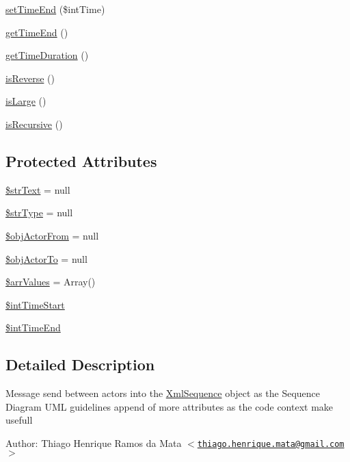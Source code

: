 \begin{CompactItemize}
\hyperlink{class_xml_sequence_message_c7e86ac9821f16f99b51d69c03f522bc}{setTimeEnd} (\$intTime)
\item 
\hyperlink{class_xml_sequence_message_3a9eaea81ee7f74f90108c9b3c5d60da}{getTimeEnd} ()
\item 
\hyperlink{class_xml_sequence_message_9c044f30dde50e09fa8e7e916fba8a3f}{getTimeDuration} ()
\item 
\hyperlink{class_xml_sequence_message_ce0d3717d6009009afd211ae37fbaea5}{isReverse} ()
\item 
\hyperlink{class_xml_sequence_message_1d7efe7edac17270d4af8dafe8e950ef}{isLarge} ()
\item 
\hyperlink{class_xml_sequence_message_aa472e233121aa79f3c5c1298b4bc7cb}{isRecursive} ()
\end{CompactItemize}
\subsection*{Protected Attributes}
\begin{CompactItemize}
\item 
\hyperlink{class_xml_sequence_message_e870578cac1ab9406d8fd471df9d8f98}{\$strText} = null
\item 
\hyperlink{class_xml_sequence_message_ac9a08cb422ab9a398d451299b054e28}{\$strType} = null
\item 
\hyperlink{class_xml_sequence_message_e9dd3763377b6dc6e6d6a6d3d8251d7a}{\$objActorFrom} = null
\item 
\hyperlink{class_xml_sequence_message_8e20973ff6f3a2e22915b6e1bc7b528d}{\$objActorTo} = null
\item 
\hyperlink{class_xml_sequence_message_23c5acd360d2d5bf35038716f66b9020}{\$arrValues} = Array()
\item 
\hyperlink{class_xml_sequence_message_266d64fdbc93740632447a8989775f6c}{\$intTimeStart}
\item 
\hyperlink{class_xml_sequence_message_2c9ee3961c923198712100af2100510a}{\$intTimeEnd}
\end{CompactItemize}


\subsection{Detailed Description}
Message send between actors into the \hyperlink{class_xml_sequence}{XmlSequence} object as the Sequence Diagram UML guidelines append of more attributes as the code context make usefull \begin{Desc}
\item[Author:]Thiago Henrique Ramos da Mata $<$\href{mailto:thiago.henrique.mata@gmail.com}{\tt thiago.henrique.mata@gmail.com}$>$ \end{Desc}


